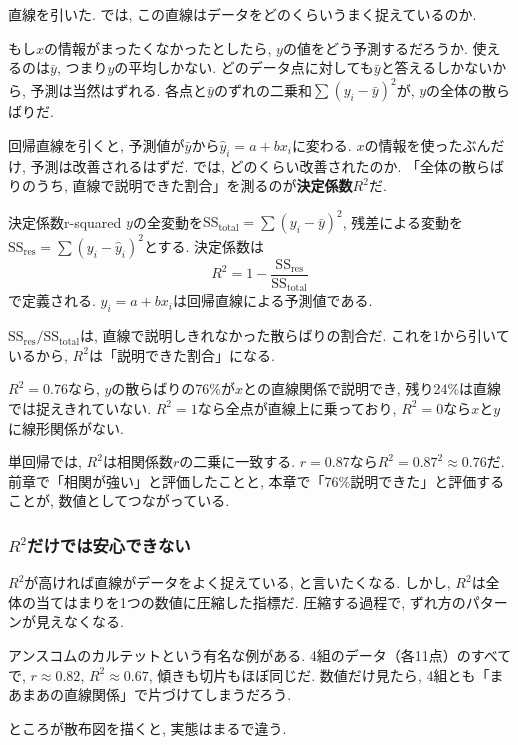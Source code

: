 直線を引いた.
では, この直線はデータをどのくらいうまく捉えているのか.

もし$x$の情報がまったくなかったとしたら, $y$の値をどう予測するだろうか.
使えるのは$\bar{y}$, つまり$y$の平均しかない.
どのデータ点に対しても$\bar{y}$と答えるしかないから, 予測は当然はずれる.
各点と$\bar{y}$のずれの二乗和$\sum(y_i - \bar{y})^2$が, $y$の全体の散らばりだ.

回帰直線を引くと, 予測値が$\bar{y}$から$\hat{y}_i = a + bx_i$に変わる.
$x$の情報を使ったぶんだけ, 予測は改善されるはずだ.
では, どのくらい改善されたのか.
「全体の散らばりのうち, 直線で説明できた割合」を測るのが\textbf{決定係数}$R^2$だ.

\begin{defi}{決定係数}{r-squared}
$y$の全変動を$\mathrm{SS_{total}} = \sum(y_i - \bar{y})^2$, 残差による変動を$\mathrm{SS_{res}} = \sum(y_i - \hat{y}_i)^2$とする.
決定係数は
\[
  R^2 = 1 - \frac{\mathrm{SS_{res}}}{\mathrm{SS_{total}}}
\]
で定義される. $\hat{y}_i = a + bx_i$は回帰直線による予測値である.
\end{defi}

$\mathrm{SS_{res}} / \mathrm{SS_{total}}$は, 直線で説明しきれなかった散らばりの割合だ.
これを1から引いているから, $R^2$は「説明できた割合」になる.

$R^2 = 0.76$なら, $y$の散らばりの76\%が$x$との直線関係で説明でき, 残り24\%は直線では捉えきれていない.
$R^2 = 1$なら全点が直線上に乗っており, $R^2 = 0$なら$x$と$y$に線形関係がない.

単回帰では, $R^2$は相関係数$r$の二乗に一致する.
$r = 0.87$なら$R^2 = 0.87^2 \approx 0.76$だ.
前章で「相関が強い」と評価したことと, 本章で「76\%説明できた」と評価することが, 数値としてつながっている.

\subsubsection*{$R^2$だけでは安心できない}

$R^2$が高ければ直線がデータをよく捉えている, と言いたくなる.
しかし, $R^2$は全体の当てはまりを1つの数値に圧縮した指標だ.
圧縮する過程で, ずれ方のパターンが見えなくなる.

アンスコムのカルテットという有名な例がある.
4組のデータ（各11点）のすべてで, $r \approx 0.82$, $R^2 \approx 0.67$, 傾きも切片もほぼ同じだ.
数値だけ見たら, 4組とも「まあまあの直線関係」で片づけてしまうだろう.

ところが散布図を描くと, 実態はまるで違う.


